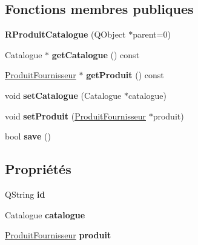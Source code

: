 \subsection*{Fonctions membres publiques}
\begin{DoxyCompactItemize}
\item 
\hypertarget{class_r_produit_catalogue_a9986c1b5f3cf94cbf5d90b31efce6bf2}{
{\bfseries RProduitCatalogue} (QObject $\ast$parent=0)}
\label{db/dc5/class_r_produit_catalogue_a9986c1b5f3cf94cbf5d90b31efce6bf2}

\item 
\hypertarget{class_r_produit_catalogue_a3ef4c1fdbf2f726b0694535a7246a50a}{
Catalogue $\ast$ {\bfseries getCatalogue} () const }
\label{db/dc5/class_r_produit_catalogue_a3ef4c1fdbf2f726b0694535a7246a50a}

\item 
\hypertarget{class_r_produit_catalogue_ab148856d056e2602592404b251f9bd86}{
\hyperlink{class_produit_fournisseur}{ProduitFournisseur} $\ast$ {\bfseries getProduit} () const }
\label{db/dc5/class_r_produit_catalogue_ab148856d056e2602592404b251f9bd86}

\item 
\hypertarget{class_r_produit_catalogue_a6696217f8287d400cb21c93399c69605}{
void {\bfseries setCatalogue} (Catalogue $\ast$catalogue)}
\label{db/dc5/class_r_produit_catalogue_a6696217f8287d400cb21c93399c69605}

\item 
\hypertarget{class_r_produit_catalogue_a6b0599536fe27bd99bc99089a1c750a4}{
void {\bfseries setProduit} (\hyperlink{class_produit_fournisseur}{ProduitFournisseur} $\ast$produit)}
\label{db/dc5/class_r_produit_catalogue_a6b0599536fe27bd99bc99089a1c750a4}

\item 
\hypertarget{class_r_produit_catalogue_a8e93f5ce0b3ebccac36eb23041e59fdb}{
bool {\bfseries save} ()}
\label{db/dc5/class_r_produit_catalogue_a8e93f5ce0b3ebccac36eb23041e59fdb}

\end{DoxyCompactItemize}
\subsection*{Propriétés}
\begin{DoxyCompactItemize}
\item 
\hypertarget{class_r_produit_catalogue_ae6854a229a8921b08e8d72b9189f5d97}{
QString {\bfseries id}}
\label{db/dc5/class_r_produit_catalogue_ae6854a229a8921b08e8d72b9189f5d97}

\item 
\hypertarget{class_r_produit_catalogue_a88487bc822cb20770b27a977ef39bbd4}{
Catalogue {\bfseries catalogue}}
\label{db/dc5/class_r_produit_catalogue_a88487bc822cb20770b27a977ef39bbd4}

\item 
\hypertarget{class_r_produit_catalogue_a79ada5bf195b8472f442c1fec761b4ab}{
\hyperlink{class_produit_fournisseur}{ProduitFournisseur} {\bfseries produit}}
\label{db/dc5/class_r_produit_catalogue_a79ada5bf195b8472f442c1fec761b4ab}

\end{DoxyCompactItemize}


